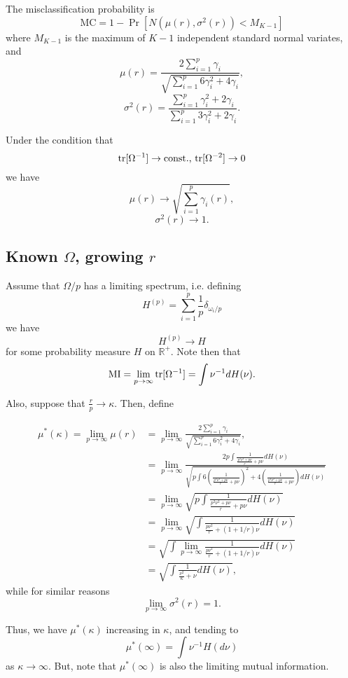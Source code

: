 \documentclass[12pt]{article}
\begin{document}
The misclassification probability is
\[
\text{MC} = 1 - \Pr[N(\mu(r), \sigma^2(r)) < M_{K-1}]
\]
where $M_{K-1}$ is the maximum of $K-1$ independent standard normal variates,
and
\[
\mu(r) = \frac{2\sum_{i=1}^p \gamma_i}{\sqrt{\sum_{i=1}^p 6\gamma_i^2 + 4 \gamma_i}},
\]
\[
\sigma^2(r) = \frac{\sum_{i=1}^p \gamma_i ^2 + 2\gamma_i}{\sum_{i=1}^p 3\gamma_i^2 + 2\gamma_i}.
\]

Under the condition that
\[
\text{tr}[\Omega^{-1}] \to \text{const., }\text{tr}[\Omega^{-2}] \to 0
\]
we have
\[
\mu(r) \to \sqrt{\sum_{i=1}^p \gamma_i(r)},
\]
\[
\sigma^2(r) \to 1.
\]

\subsection{Known $\Omega$, growing $r$}

Assume that $\Omega/p$ has a limiting spectrum, i.e.
defining
\[
H^{(p)} = \sum_{i=1}^p \frac{1}{p}\delta_{\omega_i/p}
\]
we have
\[
H^{(p)} \to H
\]
for some probability measure $H$ on $\mathbb{R}^+$.
Note then that
\[
\text{MI} = \lim_{p\to\infty} \text{tr}[\Omega^{-1}] = \int \nu^{-1} dH(\nu).
\]

Also, suppose that $\frac{r}{p} \to \kappa$.
Then, define

\begin{align*}
\mu^*(\kappa) = \lim_{p \to \infty} \mu(r) &= \lim_{p \to \infty} \frac{2\sum_{i=1}^p \gamma_i}{\sqrt{\sum_{i=1}^p 6\gamma_i^2 + 4 \gamma_i}},
\\&= \lim_{p \to \infty} \frac{2p \int \frac{1}{\frac{p^2 \nu^2 + p\nu}{r} + p\nu}dH(\nu)}{
\sqrt{
p\int 6\left(\frac{1}{\frac{p^2 \nu^2 + p\nu}{r} + p\nu}\right)^2 + 4 \left(\frac{1}{\frac{p^2 \nu^2 + p\nu}{r} + p\nu}\right)dH(\nu)
}
}
\\&= \lim_{p \to \infty} \sqrt{p \int \frac{1}{\frac{p^2 \nu^2 + p\nu}{r} + p\nu}dH(\nu)}
\\&= \lim_{p \to \infty} \sqrt{\int \frac{1}{\frac{p \nu^2}{r} + (1 + 1/r)\nu}dH(\nu)}
\\&= \sqrt{\int \lim_{p \to \infty} \frac{1}{\frac{p \nu^2}{r} + (1 + 1/r)\nu}dH(\nu)}
\\&= \sqrt{\int \frac{1}{\frac{\nu^2}{\kappa} + \nu} dH(\nu)},
\end{align*}
while for similar reasons
\[
\lim_{p \to \infty} \sigma^2(r) = 1.
\]

Thus, we have $\mu^*(\kappa)$ increasing in $\kappa$, and tending to
\[
\mu^*(\infty) = \int \nu^{-1} H(d\nu)
\]
as $\kappa \to \infty$.
But, note that $\mu^*(\infty)$ is also the limiting mutual information.
\end{document}
